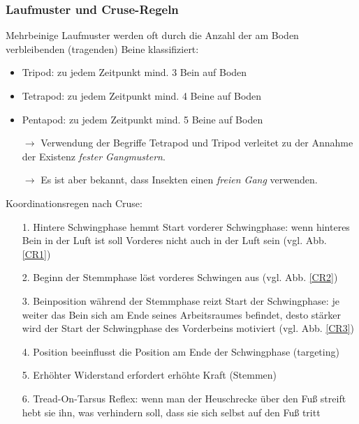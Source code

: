 \subsubsection{Laufmuster und Cruse-Regeln}
Mehrbeinige Laufmuster werden oft durch die Anzahl der
am Boden verbleibenden (tragenden) Beine klassifiziert:
\begin{itemize}
\item Tripod: zu jedem Zeitpunkt mind. 3 Bein auf Boden
\item Tetrapod: zu jedem Zeitpunkt mind. 4 Beine auf Boden
\item Pentapod: zu jedem Zeitpunkt mind. 5 Beine auf Boden
\item[$\rightarrow$] Verwendung der Begriffe Tetrapod und Tripod
verleitet zu der Annahme der Existenz \textit{fester Gangmustern}.
\item[$\rightarrow$] Es ist aber bekannt, dass Insekten einen \textit{freien
Gang} verwenden.
\end{itemize}
Koordinationsregen nach Cruse:
\begin{itemize}
\item[1.] Hintere Schwingphase hemmt Start vorderer Schwingphase: wenn hinteres Bein in der Luft ist soll Vorderes nicht auch in der Luft sein (vgl. Abb. \ref{CR1})
\item[2.] Beginn der Stemmphase löst vorderes Schwingen aus (vgl. Abb. \ref{CR2})
\item[3.] Beinposition während der Stemmphase reizt Start der Schwingphase: je weiter das Bein sich am Ende seines Arbeitsraumes befindet, desto stärker wird der Start der Schwingphase des Vorderbeins motiviert (vgl. Abb. \ref{CR3})
\item[4.] Position beeinflusst die Position am Ende der Schwingphase (\glqq targeting\grqq)
\item[5.] Erhöhter Widerstand erfordert erhöhte Kraft (Stemmen)
\item[6.] Tread-On-Tarsus Reflex: wenn man der Heuschrecke über den Fuß streift hebt sie ihn, was verhindern soll, dass sie sich selbst auf den Fuß tritt
\end{itemize}
